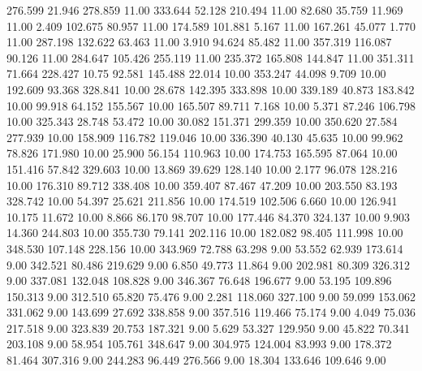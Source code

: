  276.599   21.946  278.859        11.00
 333.644   52.128  210.494        11.00
  82.680   35.759   11.969        11.00
   2.409  102.675   80.957        11.00
 174.589  101.881    5.167        11.00
 167.261   45.077    1.770        11.00
 287.198  132.622   63.463        11.00
   3.910   94.624   85.482        11.00
 357.319  116.087   90.126        11.00
 284.647  105.426  255.119        11.00
 235.372  165.808  144.847        11.00
 351.311   71.664  228.427        10.75
  92.581  145.488   22.014        10.00
 353.247   44.098    9.709        10.00
 192.609   93.368  328.841        10.00
  28.678  142.395  333.898        10.00
 339.189   40.873  183.842        10.00
  99.918   64.152  155.567        10.00
 165.507   89.711    7.168        10.00
   5.371   87.246  106.798        10.00
 325.343   28.748   53.472        10.00
  30.082  151.371  299.359        10.00
 350.620   27.584  277.939        10.00
 158.909  116.782  119.046        10.00
 336.390   40.130   45.635        10.00
  99.962   78.826  171.980        10.00
  25.900   56.154  110.963        10.00
 174.753  165.595   87.064        10.00
 151.416   57.842  329.603        10.00
  13.869   39.629  128.140        10.00
   2.177   96.078  128.216        10.00
 176.310   89.712  338.408        10.00
 359.407   87.467   47.209        10.00
 203.550   83.193  328.742        10.00
  54.397   25.621  211.856        10.00
 174.519  102.506    6.660        10.00
 126.941   10.175   11.672        10.00
   8.866   86.170   98.707        10.00
 177.446   84.370  324.137        10.00
   9.903   14.360  244.803        10.00
 355.730   79.141  202.116        10.00
 182.082   98.405  111.998        10.00
 348.530  107.148  228.156        10.00
 343.969   72.788   63.298         9.00
  53.552   62.939  173.614         9.00
 342.521   80.486  219.629         9.00
   6.850   49.773   11.864         9.00
 202.981   80.309  326.312         9.00
 337.081  132.048  108.828         9.00
 346.367   76.648  196.677         9.00
  53.195  109.896  150.313         9.00
 312.510   65.820   75.476         9.00
   2.281  118.060  327.100         9.00
  59.099  153.062  331.062         9.00
 143.699   27.692  338.858         9.00
 357.516  119.466   75.174         9.00
   4.049   75.036  217.518         9.00
 323.839   20.753  187.321         9.00
   5.629   53.327  129.950         9.00
  45.822   70.341  203.108         9.00
  58.954  105.761  348.647         9.00
 304.975  124.004   83.993         9.00
 178.372   81.464  307.316         9.00
 244.283   96.449  276.566         9.00
  18.304  133.646  109.646         9.00
